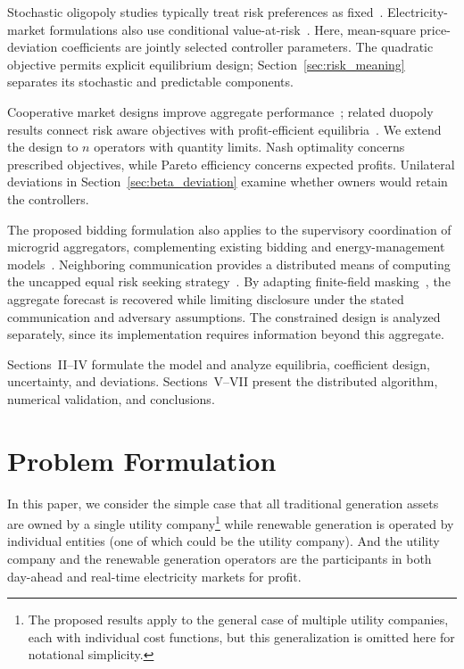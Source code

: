 \documentclass[journal]{IEEEtran}
\begin{document}
Stochastic oligopoly studies typically treat risk preferences as fixed~\cite{cheng2002bertrand,sakai1989risk,gulpinar2014analysis,asplund2002risk,Chronopoulos2014}.
Electricity-market formulations also use conditional value-at-risk~\cite{Barroso2009,Gong2009,Zheng2023,Xiao2025}. Here, mean-square price-deviation coefficients are jointly selected controller parameters. The quadratic objective permits explicit equilibrium design; Section~\ref{sec:risk_meaning} separates its stochastic and predictable components.

Cooperative market designs improve aggregate performance~\cite{hobbs2001individual,zhao2010social,su2018integrated}; related duopoly results connect risk aware objectives with profit-efficient equilibria~\cite{Truong26}. We extend the design to $n$ operators with quantity limits. Nash optimality concerns prescribed objectives, while Pareto efficiency concerns expected profits. Unilateral deviations in Section~\ref{sec:beta_deviation} examine whether owners would retain the controllers.

The proposed bidding formulation also applies to the supervisory coordination of microgrid aggregators, complementing existing bidding and energy-management models~\cite{7273948,7393823,8554122,8141420}. Neighboring communication provides a distributed means of computing the uncapped equal risk seeking strategy~\cite{qu,molzahn2017survey,yang2019survey}. By adapting finite-field masking~\cite{Gupta2020PrivateConsensus}, the aggregate forecast is recovered while limiting disclosure under the stated communication and adversary assumptions. The constrained design is analyzed separately, since its implementation requires information beyond this aggregate.

Sections~II--IV formulate the model and analyze equilibria, coefficient design, uncertainty, and deviations. Sections~V--VII present the distributed algorithm, numerical validation, and conclusions.

\section{Problem Formulation}

In this paper, we consider the simple case that all traditional generation assets are owned by a single utility company\footnote{The proposed results apply to the general case of multiple utility companies, each with individual cost functions, but this generalization is omitted here for notational simplicity.} while renewable generation is operated by individual entities (one of which could be the utility company). And the utility company and the renewable generation operators are the participants in both day-ahead and real-time electricity markets for profit. 
\end{document}

